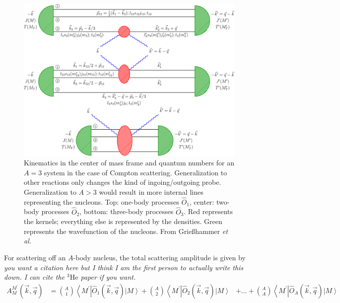 \documentclass[a4paper,11pt]{article}
\newcommand{\etal}{\textit{et al.}}
\newcommand{\HeT}{{}^{3} \mathrm{He}}
\newcommand\bv[1]{\vec{#1}}
\newcommand{\ques}[1]{\color{red}\textit{ #1 }\color{black}}
\begin{document}
\begin{figure}[h]
  \begin{center}
    \includegraphics[scale=0.7]{kinematics3He.pdf}
    \caption{Kinematics in the center of mass frame and quantum
      numbers for an $A=3$ system in the case of Compton scattering.
      Generalization to other reactions only changes the kind of
      ingoing/outgoing probe. Generalization to $A>3$ would result in more internal lines
      representing the nucleons.
      Top: one-body processes $\hat{O}_1$,
      center: two-body
      processes $\hat{O}_{2}$, bottom: three-body processes
      $\hat{O}_{3}$. Red represents the kernels; 
      everything else is represented by the densities.
      Green represents the wavefunction of the nucleons.
      From Grie{\ss}hammer \etal
    \cite{hammer2020}}
    \label{fig:onetwobod}
  \end{center}
\end{figure}

For scattering off an $A$-body nucleus, the total scattering
amplitude is given by \ques{you want a citation here but I think I am the first person to actually write this down. I can cite the $\HeT$ paper if you want.}
\begin{align}
  A_{M}^{M^{\prime} }(\bv{k}, \bv{q})&=\binom{A}{1}\left\langle
  M^{\prime}\right|\hat{O}_{1}^{}(\bv{k}, \bv{q})\left|M\right
  \rangle + \binom{A}{2} \left\langle
  M^{\prime}\right|\hat{O}_{2}^{}(\bv{k}, \bv{q}) \left|
  M\right\rangle
  &+... + \binom{A}{A}\left\langle
  M^{\prime}\right|\hat{O}_{A}^{}(\bv{k}, \bv{q})\left|M\right
  \rangle
\end{align}
\end{document}
